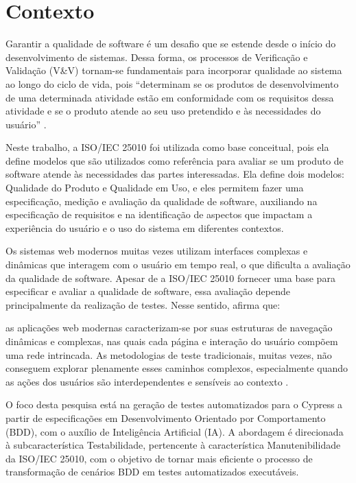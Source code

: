 \section{Contexto}\label{contextualizacao}

Garantir a qualidade de software é um desafio que se estende desde o início do desenvolvimento de sistemas. Dessa forma, os processos de Verificação e Validação (V\&V) tornam-se fundamentais para incorporar qualidade ao sistema ao longo do ciclo de vida, pois ``determinam se os produtos de desenvolvimento de uma determinada atividade estão em conformidade com os requisitos dessa atividade e se o produto atende ao seu uso pretendido e às necessidades do usuário''  \cite[p.~10, tradução nossa]{IEEE1012-2016}.

Neste trabalho, a ISO/IEC 25010 \cite{ISO25010} foi utilizada como base conceitual, pois ela define modelos que são utilizados como referência para avaliar se um produto de software atende às necessidades das partes interessadas. Ela define dois modelos: Qualidade do Produto e Qualidade em Uso, e eles permitem fazer uma especificação, medição e avaliação da qualidade de software, auxiliando na especificação de requisitos e na identificação de aspectos que impactam a experiência do usuário e o uso do sistema em diferentes contextos.

Os sistemas web modernos muitas vezes utilizam interfaces complexas e dinâmicas que interagem com o usuário em tempo real, o que dificulta a avaliação da qualidade de software. Apesar de a ISO/IEC 25010 fornecer uma base para especificar e avaliar a qualidade de software, essa avaliação depende principalmente da realização de testes. Nesse sentido,  afirma que:

\begin{citacao}
as aplicações web modernas caracterizam-se por suas estruturas de navegação dinâmicas e complexas, nas quais cada página e interação do usuário compõem uma rede intrincada. As metodologias de teste tradicionais, muitas vezes, não conseguem explorar plenamente esses caminhos complexos, especialmente quando as ações dos usuários são interdependentes e sensíveis ao contexto \cite[p.~1, tradução nossa]{Mughal2025}.
\end{citacao}


O foco desta pesquisa está na geração de testes automatizados para o Cypress a partir de especificações em Desenvolvimento Orientado por Comportamento (BDD), com o auxílio de Inteligência Artificial (IA). A abordagem é direcionada à subcaracterística Testabilidade, pertencente à característica Manutenibilidade da ISO/IEC 25010, com o objetivo de tornar mais eficiente o processo de transformação de cenários BDD em testes automatizados executáveis.

